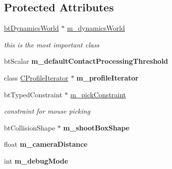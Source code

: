 \subsection*{Protected Attributes}
\begin{DoxyCompactItemize}
\item 
\hypertarget{class_demo_application_a743e8192778eb8d8431ef596c2e0812d}{\hyperlink{classbt_dynamics_world}{bt\+Dynamics\+World} $\ast$ \hyperlink{class_demo_application_a743e8192778eb8d8431ef596c2e0812d}{m\+\_\+dynamics\+World}}\label{class_demo_application_a743e8192778eb8d8431ef596c2e0812d}

\begin{DoxyCompactList}\small\item\em this is the most important class \end{DoxyCompactList}\item 
\hypertarget{class_demo_application_a308fa3cfd921641be311a476b6ffd975}{bt\+Scalar {\bfseries m\+\_\+default\+Contact\+Processing\+Threshold}}\label{class_demo_application_a308fa3cfd921641be311a476b6ffd975}

\item 
\hypertarget{class_demo_application_a90bbcb66d1dd643bab941a5c75c72576}{class \hyperlink{class_c_profile_iterator}{C\+Profile\+Iterator} $\ast$ {\bfseries m\+\_\+profile\+Iterator}}\label{class_demo_application_a90bbcb66d1dd643bab941a5c75c72576}

\item 
\hypertarget{class_demo_application_a0c6b0de711c28e8e28fc4a4fe2587955}{bt\+Typed\+Constraint $\ast$ \hyperlink{class_demo_application_a0c6b0de711c28e8e28fc4a4fe2587955}{m\+\_\+pick\+Constraint}}\label{class_demo_application_a0c6b0de711c28e8e28fc4a4fe2587955}

\begin{DoxyCompactList}\small\item\em constraint for mouse picking \end{DoxyCompactList}\item 
\hypertarget{class_demo_application_a0668f7ad329ee3e3a0d513dd62d845e1}{bt\+Collision\+Shape $\ast$ {\bfseries m\+\_\+shoot\+Box\+Shape}}\label{class_demo_application_a0668f7ad329ee3e3a0d513dd62d845e1}

\item 
\hypertarget{class_demo_application_a1671c787430b9530ead409a15753f88d}{float {\bfseries m\+\_\+camera\+Distance}}\label{class_demo_application_a1671c787430b9530ead409a15753f88d}

\item 
\hypertarget{class_demo_application_afd2a3b503b404e598aff4d2ca91a906a}{int {\bfseries m\+\_\+debug\+Mode}}\label{class_demo_application_afd2a3b503b404e598aff4d2ca91a906a}


\end{DoxyCompactItemize}
